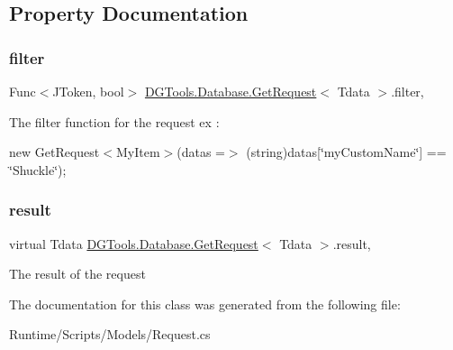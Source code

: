 \subsection{Property Documentation}
\mbox{\label{class_d_g_tools_1_1_database_1_1_get_request_aeb636422673999df2a0511b1507428cb}} 
\subsubsection{\texorpdfstring{filter}{filter}}
{\footnotesize\ttfamily Func$<$J\+Token, bool$>$ \mbox{\hyperlink{class_d_g_tools_1_1_database_1_1_get_request}{D\+G\+Tools.\+Database.\+Get\+Request}}$<$ Tdata $>$.filter\hspace{0.3cm}{\ttfamily [get]}, {}}



The filter function for the request ex \+: 

{\ttfamily  new Get\+Request$<$\+My\+Item$>$(datas =$>$ (string)datas\mbox{[}\char`\"{}my\+Custom\+Name\char`\"{}\mbox{]} == \char`\"{}\+Shuckle\char`\"{}); } \mbox{\label{class_d_g_tools_1_1_database_1_1_get_request_aa8260a07cb7629a784afcc1db7ae48ee}} 
\subsubsection{\texorpdfstring{result}{result}}
{\footnotesize\ttfamily virtual Tdata \mbox{\hyperlink{class_d_g_tools_1_1_database_1_1_get_request}{D\+G\+Tools.\+Database.\+Get\+Request}}$<$ Tdata $>$.result\hspace{0.3cm}{\ttfamily [get]}, {}}



The result of the request 



The documentation for this class was generated from the following file\+:\begin{DoxyCompactItemize}
\item 
Runtime/\+Scripts/\+Models/Request.\+cs\end{DoxyCompactItemize}
